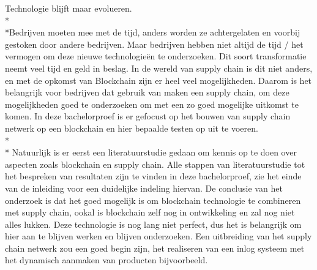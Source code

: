Technologie blijft maar evolueren. \\*\\*Bedrijven moeten mee met de tijd, anders worden ze achtergelaten en voorbij gestoken door andere bedrijven. Maar bedrijven hebben niet altijd de tijd / het vermogen om deze nieuwe technologieën te onderzoeken. Dit soort transformatie neemt veel tijd en geld in beslag. In de wereld van supply chain is dit niet anders, en met de opkomst van Blockchain zijn er heel veel mogelijkheden. Daarom is het belangrijk voor bedrijven dat gebruik van maken een supply chain, om deze mogelijkheden goed te onderzoeken om met een zo goed mogelijke uitkomst te komen. In deze bachelorproef is er gefocust op het bouwen van supply chain netwerk op een blockchain en hier bepaalde testen op uit te voeren.\\*\\* Natuurlijk is er eerst een literatuurstudie gedaan om kennis op te doen over aspecten zoals blockchain en supply chain. Alle stappen van literatuurstudie tot het bespreken van resultaten zijn te vinden in deze bachelorproef, zie het einde van de inleiding voor een duidelijke indeling hiervan. De conclusie van het onderzoek is dat het goed mogelijk is om blockchain technologie te combineren met supply chain, ookal is blockchain zelf nog in ontwikkeling en zal nog niet alles lukken. Deze technologie is nog lang niet perfect, dus het is belangrijk om hier aan te blijven werken en blijven onderzoeken. Een uitbreiding van het supply chain netwerk zou een goed begin zijn, het realiseren van een inlog systeem met het dynamisch aanmaken van producten bijvoorbeeld.